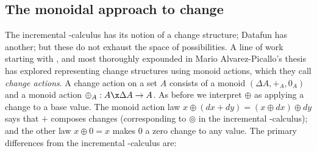 



\subsection{The monoidal approach to change}
\label{section-monoidal-change}

The incremental \fn-calculus has its notion of a change structure; Datafun has another; but these do not exhaust the space of possibilities. A line of work starting with \citet{DBLP:conf/esop/Alvarez-Picallo19}, and most thoroughly expounded in Mario Alvarez-Picallo's thesis~\citeyearpar{mario-thesis} has explored representing change structures using monoid actions, which they call \emph{change actions}. 
A change action on a set $A$ consists of a monoid $(\Delta A, +_A, 0_A)$ and a monoid action $\oplus_A : A \x \Delta A \to A$.
%
As before we interpret $\oplus$ as applying a change to a base value.
%
The monoid action law $x \oplus (dx + dy) = (x \oplus dx) \oplus dy$ says that $+$ composes changes (corresponding to $\circledcirc$ in the incremental \fn-calculus); and the other law $x \oplus 0 = x$ makes $0$ a zero change to any value.
%
The primary differences from the incremental \fn-calculus are:

